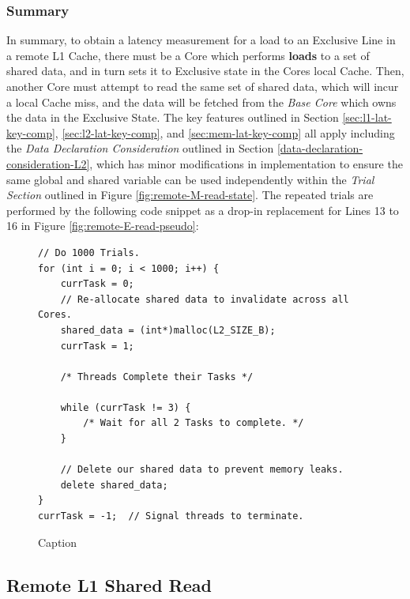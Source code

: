 \documentclass[bsc,frontabs,twoside,singlespacing,parskip,deptreport]{infthesis}     %
\begin{document}
\subsubsection{Summary}
In summary, to obtain a latency measurement for a load to an Exclusive Line in a remote L1 Cache, there must be a Core which performs \textbf{loads} to a set of shared data, and in turn sets it to Exclusive state in the Cores local Cache. Then, another Core must attempt to read the same set of shared data, which will incur a local Cache miss, and the data will be fetched from the \emph{Base Core} which owns the data in the Exclusive State. The key features outlined in Section \ref{sec:l1-lat-key-comp}, \ref{sec:l2-lat-key-comp}, and \ref{sec:mem-lat-key-comp} all apply including the \textit{Data Declaration Consideration} outlined in Section \ref{data-declaration-consideration-L2}, which has minor modifications in implementation to ensure the same global and shared variable can be used independently within the \textit{Trial Section} outlined in Figure \ref{fig:remote-M-read-state}. The repeated trials are performed by the following code snippet as a drop-in replacement for Lines 13 to 16 in Figure \ref{fig:remote-E-read-pseudo}:
\begin{figure}[!h]
    \centering
    \begin{minipage}{0.8\textwidth}
    \begin{verbatim}
// Do 1000 Trials.
for (int i = 0; i < 1000; i++) {
    currTask = 0;
    // Re-allocate shared data to invalidate across all Cores.
    shared_data = (int*)malloc(L2_SIZE_B);
    currTask = 1;

    /* Threads Complete their Tasks */
        
    while (currTask != 3) {
        /* Wait for all 2 Tasks to complete. */
    }

    // Delete our shared data to prevent memory leaks.
    delete shared_data;
}
currTask = -1;  // Signal threads to terminate.
    \end{verbatim}
    \end{minipage}
    \caption{Caption}
    \label{fig:remote-E-repeat}
\end{figure}

\subsection{Remote L1 Shared Read}\label{sec:shared-read}
\end{document}
